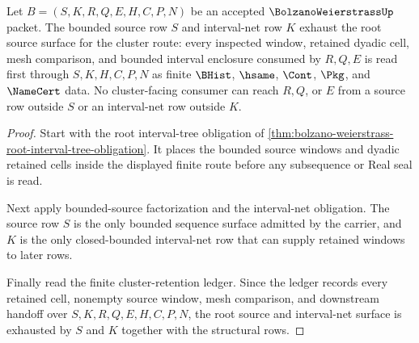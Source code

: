 \begin{theorem}
\label{thm:bolzano-weierstrass-source-net-exhaustion}
Let $B=(S,K,R,Q,E,H,C,P,N)$ be an accepted $\BolzanoWeierstrassUp$ packet. The bounded source row $S$ and interval-net row $K$ exhaust the root source surface for the cluster route: every inspected window, retained dyadic cell, mesh comparison, and bounded interval enclosure consumed by $R,Q,E$ is read first through $S,K,H,C,P,N$ as finite $\BHist$, $\hsame$, $\Cont$, $\Pkg$, and $\NameCert$ data. No cluster-facing consumer can reach $R,Q$, or $E$ from a source row outside $S$ or an interval-net row outside $K$.
\end{theorem}
\begin{proof}
Start with the root interval-tree obligation of \autoref{thm:bolzano-weierstrass-root-interval-tree-obligation}. It places the bounded source windows and dyadic retained cells inside the displayed finite route before any subsequence or Real seal is read.

Next apply bounded-source factorization and the interval-net obligation. The source row $S$ is the only bounded sequence surface admitted by the carrier, and $K$ is the only closed-bounded interval-net row that can supply retained windows to later rows.

Finally read the finite cluster-retention ledger. Since the ledger records every retained cell, nonempty source window, mesh comparison, and downstream handoff over $S,K,R,Q,E,H,C,P,N$, the root source and interval-net surface is exhausted by $S$ and $K$ together with the structural rows.
\end{proof}

